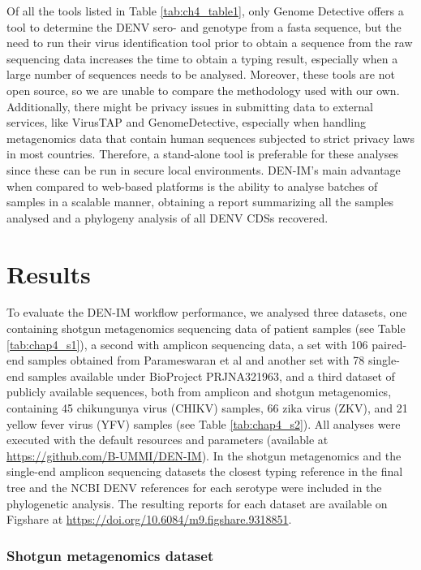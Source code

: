 Of all the tools listed in Table \ref{tab:ch4_table1}, only Genome Detective offers a tool to determine the DENV sero- and genotype from a fasta sequence, but the need to run their virus identification tool prior to obtain a sequence from the raw sequencing data increases the time to obtain a typing result, especially when a large number of sequences needs to be analysed. Moreover, these tools are not open source, so we are unable to compare the methodology used with our own. Additionally, there might be privacy issues in submitting data to external services, like VirusTAP and GenomeDetective, especially when handling metagenomics data that contain human sequences subjected to strict privacy laws in most countries. Therefore, a stand-alone tool is preferable for these analyses since these can be run in secure local environments. DEN-IM’s main advantage when compared to web-based platforms is the ability to analyse batches of samples in a scalable manner, obtaining a report summarizing all the samples analysed and a phylogeny analysis of all DENV CDSs recovered.


\section{Results}

To evaluate the DEN-IM workflow performance, we analysed three datasets, one containing shotgun metagenomics sequencing data of patient samples (see Table \ref{tab:chap4_s1}), a second with amplicon sequencing data, a set with 106 paired-end samples obtained from Parameswaran et al \citep{parameswaran_intrahost_2017} and another set with 78 single-end samples available under BioProject PRJNA321963, and a third dataset of publicly available sequences, both from amplicon and shotgun metagenomics, containing 45 chikungunya virus (CHIKV) samples, 66 zika virus (ZKV), and 21 yellow fever virus (YFV) samples (see Table \ref{tab:chap4_s2}). All analyses were executed with the default resources and parameters (available at \url{https://github.com/B-UMMI/DEN-IM}). In the shotgun metagenomics and the single-end amplicon sequencing datasets the closest typing reference in the final tree and the NCBI DENV references for each serotype were included in the phylogenetic analysis. The resulting reports for each dataset are available on Figshare at \url{https://doi.org/10.6084/m9.figshare.9318851}.

\subsubsection{Shotgun metagenomics dataset}

